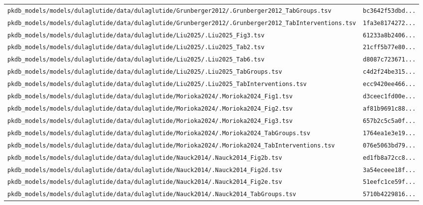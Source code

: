 \documentclass{article}
\begin{document}
\begin{longtable}{ll}
\texttt{pkdb\_models/models/dulaglutide/data/dulaglutide/Grunberger2012/.Grunberger2012\_TabGroups.tsv} & \texttt{bc3642f53dbd...} \\
\texttt{pkdb\_models/models/dulaglutide/data/dulaglutide/Grunberger2012/.Grunberger2012\_TabInterventions.tsv} & \texttt{1fa3e8174272...} \\
\texttt{pkdb\_models/models/dulaglutide/data/dulaglutide/Liu2025/.Liu2025\_Fig3.tsv} & \texttt{61233a8b2406...} \\
\texttt{pkdb\_models/models/dulaglutide/data/dulaglutide/Liu2025/.Liu2025\_Tab2.tsv} & \texttt{21cff5b77e80...} \\
\texttt{pkdb\_models/models/dulaglutide/data/dulaglutide/Liu2025/.Liu2025\_Tab6.tsv} & \texttt{d8087c723671...} \\
\texttt{pkdb\_models/models/dulaglutide/data/dulaglutide/Liu2025/.Liu2025\_TabGroups.tsv} & \texttt{c4d2f24be315...} \\
\texttt{pkdb\_models/models/dulaglutide/data/dulaglutide/Liu2025/.Liu2025\_TabInterventions.tsv} & \texttt{ecc9420ee466...} \\
\texttt{pkdb\_models/models/dulaglutide/data/dulaglutide/Morioka2024/.Morioka2024\_Fig1.tsv} & \texttt{d3ceec1fd00e...} \\
\texttt{pkdb\_models/models/dulaglutide/data/dulaglutide/Morioka2024/.Morioka2024\_Fig2.tsv} & \texttt{af81b9691c88...} \\
\texttt{pkdb\_models/models/dulaglutide/data/dulaglutide/Morioka2024/.Morioka2024\_Fig3.tsv} & \texttt{657b2c5c5a0f...} \\
\texttt{pkdb\_models/models/dulaglutide/data/dulaglutide/Morioka2024/.Morioka2024\_TabGroups.tsv} & \texttt{1764ea1e3e19...} \\
\texttt{pkdb\_models/models/dulaglutide/data/dulaglutide/Morioka2024/.Morioka2024\_TabInterventions.tsv} & \texttt{076e5063bd79...} \\
\texttt{pkdb\_models/models/dulaglutide/data/dulaglutide/Nauck2014/.Nauck2014\_Fig2b.tsv} & \texttt{ed1fb8a72cc8...} \\
\texttt{pkdb\_models/models/dulaglutide/data/dulaglutide/Nauck2014/.Nauck2014\_Fig2d.tsv} & \texttt{3a54eceee18f...} \\
\texttt{pkdb\_models/models/dulaglutide/data/dulaglutide/Nauck2014/.Nauck2014\_Fig2e.tsv} & \texttt{51eefc1ce59f...} \\
\texttt{pkdb\_models/models/dulaglutide/data/dulaglutide/Nauck2014/.Nauck2014\_TabGroups.tsv} & \texttt{5710b4229816...} \\

\end{longtable}
\end{document}
